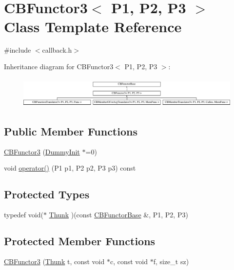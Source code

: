 \hypertarget{class_c_b_functor3}{\section{C\+B\+Functor3$<$ P1, P2, P3 $>$ Class Template Reference}
\label{class_c_b_functor3}
}


{\ttfamily \#include $<$callback.\+h$>$}

Inheritance diagram for C\+B\+Functor3$<$ P1, P2, P3 $>$\+:\begin{figure}[H]
\begin{center}
\leavevmode
\includegraphics[height=1.600000cm]{class_c_b_functor3}
\end{center}
\end{figure}
\subsection*{Public Member Functions}
\begin{DoxyCompactItemize}
\item 
\hyperlink{class_c_b_functor3_a26b445b53552e9f88910caa3a304681f}{C\+B\+Functor3} (\hyperlink{class_c_b_functor_base_1_1_dummy_init}{Dummy\+Init} $\ast$=0)
\item 
void \hyperlink{class_c_b_functor3_a716caade0cfc26f54604c2417fa0ce1f}{operator()} (P1 p1, P2 p2, P3 p3) const 
\end{DoxyCompactItemize}
\subsection*{Protected Types}
\begin{DoxyCompactItemize}
\item 
typedef void($\ast$ \hyperlink{class_c_b_functor3_a46c2e1d034c7819a838cb9967fba95b8}{Thunk} )(const \hyperlink{class_c_b_functor_base}{C\+B\+Functor\+Base} \&, P1, P2, P3)
\end{DoxyCompactItemize}
\subsection*{Protected Member Functions}
\begin{DoxyCompactItemize}
\item 
\hyperlink{class_c_b_functor3_a3553a5b5c76ca09aa826231a289d3be1}{C\+B\+Functor3} (\hyperlink{class_c_b_functor3_a46c2e1d034c7819a838cb9967fba95b8}{Thunk} t, const void $\ast$c, const void $\ast$f, size\+\_\+t sz)
\end{DoxyCompactItemize}
